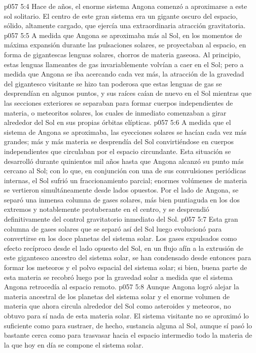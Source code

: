 \vs p057 5:4 \pc Hace  de años, el enorme sistema Angona comenzó a aproximarse a este sol solitario. El centro de este gran sistema era un gigante oscuro del espacio, sólido, altamente cargado, que ejercía una extraordinaria atracción gravitatoria.
\vs p057 5:5 A medida que Angona se aproximaba más al Sol, en los momentos de máxima expansión durante las pulsaciones solares, se proyectaban al espacio, en forma de gigantescas lenguas solares, chorros de materia gaseosa. Al principio, estas lenguas llameantes de gas invariablemente volvían a caer en el Sol; pero a medida que Angona se iba acercando cada vez más, la atracción de la gravedad del gigantesco visitante se hizo tan poderosa que estas lenguas de gas se desprendían en algunos puntos, y sus raíces caían de nuevo en el Sol mientras que las secciones exteriores se separaban para formar cuerpos independientes de materia, o meteoritos solares, los cuales de inmediato comenzaban a girar alrededor del Sol en sus propias órbitas elípticas.
\vs p057 5:6 A medida que el sistema de Angona se aproximaba, las eyecciones solares se hacían cada vez más grandes; más y más materia se desprendía del Sol convirtiéndose en cuerpos independientes que circulaban por el espacio circundante. Esta situación se desarrolló durante quinientos mil años hasta que Angona alcanzó su punto más cercano al Sol; con lo que, en conjunción con una de sus convulsiones periódicas internas, el Sol sufrió un fraccionamiento parcial; enormes volúmenes de materia se vertieron simultáneamente desde lados opuestos. Por el lado de Angona, se separó una inmensa columna de gases solares, más bien puntiaguda en los dos extremos y notablemente protuberante en el centro, y se desprendió definitivamente del control gravitatorio inmediato del Sol.
\vs p057 5:7 Esta gran columna de gases solares que se separó así del Sol luego evolucionó para convertirse en los doce planetas del sistema solar. Los gases expulsados como efecto recíproco desde el lado opuesto del Sol, en un flujo afín a la extrusión de este gigantesco ancestro del sistema solar, se han condensado desde entonces para formar los meteoros y el polvo espacial del sistema solar; si bien, buena parte de esta materia se recobró luego por la gravedad solar a medida que el sistema Angona retrocedía al espacio remoto.
\vs p057 5:8 Aunque Angona logró alejar la materia ancestral de los planetas del sistema solar y el enorme volumen de materia que ahora circula alrededor del Sol como asteroides y meteoros, no obtuvo para sí nada de esta materia solar. El sistema visitante no se aproximó lo suficiente como para sustraer, de hecho, sustancia alguna al Sol, aunque sí pasó lo bastante cerca como para trasvasar hacia el espacio intermedio todo la materia de la que hoy en día se compone el sistema solar.
